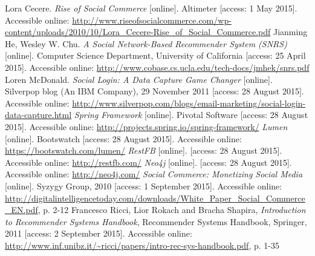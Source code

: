 \documentclass[12pt]{report}
\begin{document}
\begin{thebibliography}{99}
Lora Cecere. \textit{Rise of Social Commerce} [online]. Altimeter [access: 1 May 2015]. Accessible online: \url{http://www.riseofsocialcommerce.com/wp-content/uploads/2010/10/Lora_Cecere-Rise_of_Social_Commerce.pdf}
Jianming He, Wesley W. Chu. \textit{A Social Network-Based Recommender System (SNRS)} [online]. Computer Science Department, University of California [access: 25 April 2015]. Accessible online: \url{http://www.cobase.cs.ucla.edu/tech-docs/jmhek/snrs.pdf}
Loren McDonald. \textit{Social Login: A Data Capture Game Changer} [online]. Silverpop blog (An IBM Company), 29 November 2011 [access: 28 August 2015]. Accessible online: \url{http://www.silverpop.com/blogs/email-marketing/social-login-data-capture.html}
\textit{Spring Framework} [online]. Pivotal Software [access: 28 August 2015]. Accessible online: \url{http://projects.spring.io/spring-framework/}
\textit{Lumen} [online]. Bootswatch [access: 28 August 2015]. Accessible online: \url{https://bootswatch.com/lumen/}
\textit{RestFB} [online]. [access: 28 August 2015]. Accessible online: \url{http://restfb.com/}
\textit{Neo4j} [online]. [access: 28 August 2015]. Accessible online: \url{http://neo4j.com/}
\textit{Social Commerce: Monetizing Social Media} [online]. Syzygy Group, 2010 [access: 1 September 2015]. Accessible online: \url{http://digitalintelligencetoday.com/downloads/White_Paper_Social_Commerce_EN.pdf}, p. 2-12
Francesco Ricci, Lior Rokach and Bracha Shapira, \textit{Introduction to Recommender Systems Handbook}, Recommender Systems Handbook, Springer, 2011 [access: 2 September 2015]. Accessible online: \url{http://www.inf.unibz.it/~ricci/papers/intro-rec-sys-handbook.pdf}, p. 1-35

\end{thebibliography}
\end{document}

